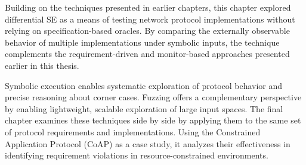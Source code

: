 Building on the techniques presented in earlier chapters, this chapter explored differential SE as a means of testing network protocol implementations without relying on specification-based oracles.
By comparing the externally observable behavior of multiple implementations under symbolic inputs, the technique complements the requirement-driven and monitor-based approaches presented earlier in this thesis.

Symbolic execution enables systematic exploration of protocol behavior and precise reasoning about corner cases.
Fuzzing offers a complementary perspective by enabling lightweight, scalable exploration of large input spaces.
The final chapter examines these techniques side by side by applying them to the same set of protocol requirements and implementations.
Using the Constrained Application Protocol (CoAP) as a case study, it analyzes their effectiveness in identifying requirement violations in resource-constrained environments.
